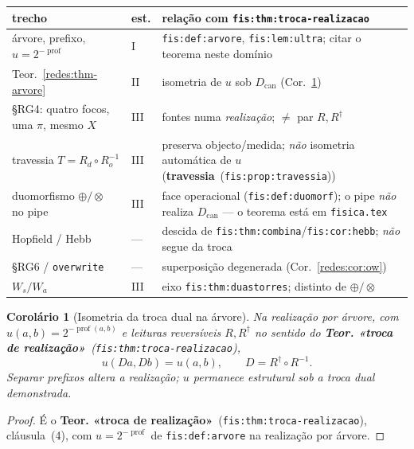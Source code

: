 \documentclass[11pt,a4paper]{article}
\newcommand{\code}[1]{\texttt{\small #1}}
\newcommand{\fis}[2]{\textbf{#2}~\textnormal{(\code{#1})}}
\newtheorem{corolario}[teorema]{Corolário}
\begin{document}
\begin{center}
{\footnotesize
\begin{tabular}{@{}>{\raggedright\arraybackslash}p{}>{\centering\arraybackslash}p{}>{\raggedright\arraybackslash}p{}@{}}
\toprule
trecho & est. & relação com \code{fis:thm:troca-realizacao} \\
\midrule
árvore, prefixo, $u=2^{-\operatorname{prof}}$ &
I & \code{fis:def:arvore}, \code{fis:lem:ultra}; citar o teorema neste domínio \\
Teor.~\ref{redes:thm-arvore} & II &
isometria de $u$ sob $D_{\mathrm{can}}$ (Cor.~\ref{redes:cor:troca-u}) \\
§RG4: quatro focos, uma $\pi$, mesmo $X$ &
III & fontes numa \emph{realização}; $\neq$ par $R,R^{\dagger}$ \\
travessia $T=R_d\circ R_o^{-1}$ &
III & preserva objecto/medida; \emph{não} isometria automática de $u$
(\fis{fis:prop:travessia}{travessia}) \\
duomorfismo $\oplus/\otimes$ no pipe &
III & face operacional (\code{fis:def:duomorf}); o pipe \emph{não} realiza
$D_{\mathrm{can}}$ --- o teorema está em \code{fisica.tex} \\
Hopfield / Hebb & --- & descida de \code{fis:thm:combina}/\code{fis:cor:hebb}; \emph{não} segue da troca \\
§RG6 / \code{overwrite} & --- & superposição degenerada (Cor.~\ref{redes:cor:ow}) \\
$W_s/W_a$ & III & eixo \code{fis:thm:duastorres}; distinto de $\oplus/\otimes$ \\
\bottomrule
\end{tabular}}
\end{center}

\begin{corolario}[Isometria da troca dual na árvore]\label{redes:cor:troca-u}
Na realização por árvore, com $u(a,b)=2^{-\operatorname{prof}(a,b)}$ e leituras
reversíveis $R,R^{\dagger}$ no sentido do
\fis{fis:thm:troca-realizacao}{Teor. «troca de realização»},
\[
u(Da,Db)=u(a,b),
\qquad D=R^{\dagger}\circ R^{-1}.
\]
\emph{Separar prefixos altera a realização; $u$ permanece estrutural sob a troca
dual demonstrada.}
\end{corolario}

\begin{proof}
É o \fis{fis:thm:troca-realizacao}{Teor. «troca de realização»}, cláusula~(4),
com $u=2^{-\operatorname{prof}}$ de \code{fis:def:arvore} na realização por árvore.
\end{proof}
\end{document}
